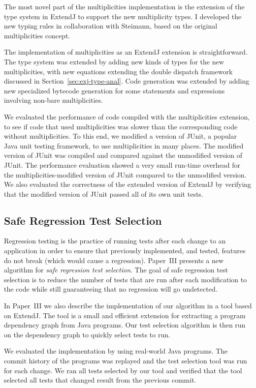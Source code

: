 \documentclass[10pt, twoside, openright]{book}
\newcommand{\secref}[1]{Section~\ref{#1}}
\begin{document}
The most novel part of the multiplicities implementation is the extension of
the type system in ExtendJ to support the new multiplicity types.
I developed the new typing rules in collaboration with Steimann, based
on the original multiplicities concept.

The implementation of multiplicities as an ExtendJ extension is straightforward.
The type system was extended by adding new kinds of types for the new multiplicities,
with new equations extending the double dispatch framework discussed in \secref{sec:exj-type-anal}.
Code generation was extended by adding new specialized bytecode generation for some statements
and expressions involving non-bare multiplicities.

We evaluated the performance of code compiled with the multiplicities extension, to see
if code that used multiplicities was slower than the corresponding code without multiplicities.
To this end, we modified a version of JUnit, a popular Java unit testing framework,
to use multiplicities
in many places. The modified version of JUnit was compiled and compared against the unmodified
version of JUnit. The performance evaluation showed a very small run-time overhead for the
multiplicities-modified version of JUnit compared to the unmodified version.
We also evaluated the
correctness of the extended version of ExtendJ by verifying that the modified version of
JUnit passed all of its own unit tests.


\subsection{Safe Regression Test Selection}

Regression testing is the practice of running tests after each change to an application in order to
ensure that previously implemented, and tested, features do not break (which would cause a
regression).
Paper~III presents a new algorithm for \emph{safe regression test selection}.
The goal of safe regression test selection is to reduce the number of
tests that are run after each modification to the code while still guaranteeing that
no regression will go undetected.

In Paper~III we also describe the
implementation of our algorithm in a tool based on ExtendJ.
The tool is a small and efficient extension for extracting a program
dependency graph from Java programs. Our test selection algorithm
is then run on the dependency graph to quickly select tests to run.

We evaluated the implementation by using real-world Java programs. The commit history of the
programs was replayed and the test selection tool was run for each change. We ran all tests
selected by our tool and verified that the tool selected all tests that changed result
from the previous commit.
\end{document}
